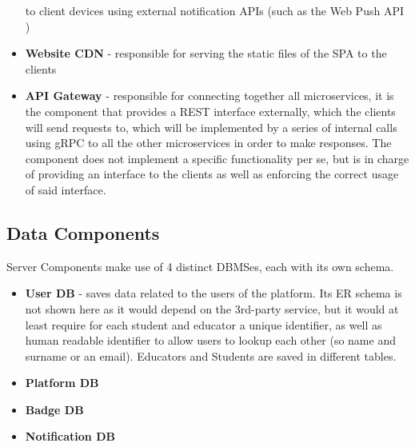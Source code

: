 \begin{itemize}
          to client devices using external notification APIs (such as the Web Push API \cite{WebPushApi})
    \item \textbf{Website CDN} {-} responsible for serving the static files of the SPA to the clients
    \item \textbf{API Gateway} {-} responsible for connecting together all microservices, it is the component that provides a REST
          interface externally, which the clients will send requests to, which will be implemented by a series of internal calls
          using gRPC \cite{gRPC} to all the other microservices in order to make responses. The component does not implement a specific
          functionality per se, but is in charge of providing an interface to the clients as well as enforcing the correct usage
          of said interface.
\end{itemize}

\subsection{Data Components}
Server Components make use of 4 distinct DBMSes, each with its own schema.
\begin{itemize}
    \item \textbf{User DB} {-} saves data related to the users of the platform. Its ER schema is not shown
          here as it would depend on the 3rd-party service, but it would at least require for each student and
          educator a unique identifier, as well as human readable identifier to allow users to lookup each other
          (so name and surname or an email). Educators and Students are saved in different tables.
          \pagebreak
    \item \textbf{Platform DB}
          \begin{adjustbox}{
                  max size={\textwidth}{},
                  center,
                  caption={Platform ER},
                  label={fig:Platform ER},
                  figure=H}
          \end{adjustbox}
          \pagebreak
    \item \textbf{Badge DB}
          \begin{adjustbox}{
                  max size={\textwidth}{},
                  center,
                  caption={Badges ER},
                  label={fig:Badges ER},
                  figure=H}
          \end{adjustbox}
    \item \textbf{Notification DB}
          \begin{adjustbox}{
                  max size={\textwidth}{},
                  center,
                  caption={Notification ER},
                  label={fig:Notification ER},
                  figure=H}
          \end{adjustbox}
\end{itemize}
\pagebreak

